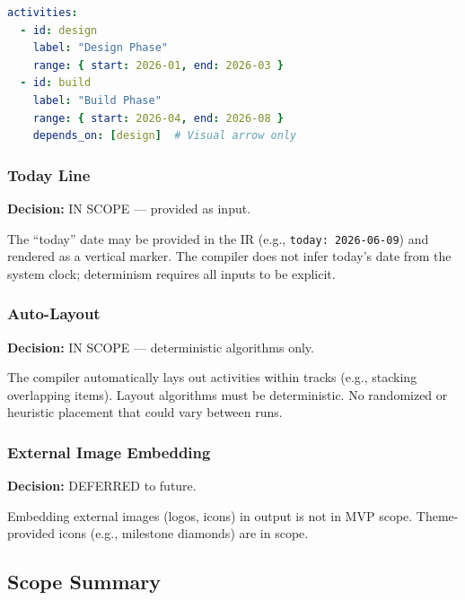 \begin{lstlisting}[language=yaml,caption={Dependencies as visual annotations}]
activities:
  - id: design
    label: "Design Phase"
    range: { start: 2026-01, end: 2026-03 }
  - id: build
    label: "Build Phase"
    range: { start: 2026-04, end: 2026-08 }
    depends_on: [design]  # Visual arrow only
\end{lstlisting}

\subsubsection{Today Line}

\textbf{Decision:} IN SCOPE — provided as input.

The ``today'' date may be provided in the IR (e.g., \texttt{today: 2026-06-09}) and rendered as a vertical marker. The compiler does not infer today's date from the system clock; determinism requires all inputs to be explicit.

\subsubsection{Auto-Layout}

\textbf{Decision:} IN SCOPE — deterministic algorithms only.

The compiler automatically lays out activities within tracks (e.g., stacking overlapping items). Layout algorithms must be deterministic. No randomized or heuristic placement that could vary between runs.

\subsubsection{External Image Embedding}

\textbf{Decision:} DEFERRED to future.

Embedding external images (logos, icons) in output is not in MVP scope. Theme-provided icons (e.g., milestone diamonds) are in scope.

\subsection{Scope Summary}

